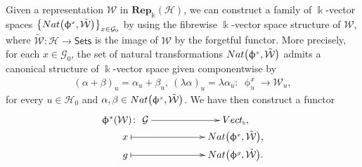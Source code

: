 \documentclass[11pt]{article}
\numberwithin{equation}{section}
\newcommand{\Rep}[1]{\mathbf{Rep}_{\Sscript{\Bbbk}}(#1)}
\newcommand{\Vect}{{\rm Vect}_{\Sscript{\Bbbk}}}
\newcommand{\Go}{\cG_{\Sscript{0}}}
\newcommand{\Ho}{\cH_{\Sscript{0}}}
\newcommand{\Wu}{\cW_{\Sscript{u}}}
\newcommand{\cG}{{\mathcal G}}
\newcommand{\cH}{{\mathcal H}}
\newcommand{\cW}{{\mathcal W}}
\newcommand{\phix}{\upphi^{\Sscript{x}}}
\newcommand{\Sets}{\mathsf{Sets}}
\newcommand{\Sscript}[1]{\scriptscriptstyle{#1}}
\begin{document}
 Given a representation $\cW$ in $\Rep{\cH}$, we can construct a family of $\Bbbk$-vector spaces \linebreak $ \big\{ {\rm Nat}\big(\phix, \tilde{\cW}\big) \big\}_{x \in \Go}$ by using the fibrewise $\Bbbk$-vector space structure of $\cW$, where $\tilde{\cW}\colon \cH \to \Sets$ is the image of $\cW$ by the forgetful functor. More precisely, for each $x \in \Go$, the set of natural transformations ${\rm Nat}\big(\phix,\tilde{\cW}\big)$ admits a canonical structure of $\Bbbk$-vector space given componentwise by
\begin{gather*}
(\alpha+ \beta)_{u} =\alpha_u + \beta_u,\ (\lambda \alpha)_{u}= \lambda \alpha_u \colon \ \phix_{\Sscript{u}} \longrightarrow \Wu,
\end{gather*}
for every $u \in \Ho$ and $\alpha, \beta \in {\rm Nat}\big(\phix, \tilde{\cW}\big)$. We have then construct a functor
\begin{gather}\label{Eq:Phistarup}
\begin{gathered}
\xymatrix@R=0pt{ \upphi^*(\cW) \colon \ \cG \ar@{->}^-{}[rr] & & \Vect, \\ x \ar@{|->}^-{}[rr] & & {\rm Nat}\big(\phix, \tilde{\cW}\big), \\ g \ar@{|->}[rr] & & {\rm Nat}\big(\upphi^{\Sscript{g}}, \tilde{\cW}\big). }
\end{gathered}
\end{gather}
\end{document}
